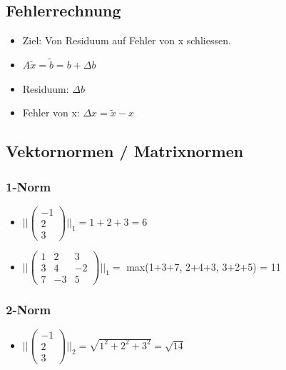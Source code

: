 \documentclass[8pt,a4paper]{scrartcl}
\begin{document}
\begin{multicols*}{3}
\begin{itemize}
				\end{itemize}
		
		\subsection{Fehlerrechnung}
			\begin{itemize}\itemsep0pt	
				\item Ziel: Von Residuum auf Fehler von x schliessen.
				\item $A \tilde{x} = \tilde{b }= b + \Delta b$
				\item Residuum: $\Delta b$
				\item Fehler von x: $\Delta x = \tilde{x}-x$
			\end{itemize}
		
		
			\subsection{Vektornormen / Matrixnormen}
				\subsubsection{1-Norm}			
					\begin{itemize}\itemsep0pt	
						\item $||\begin{pmatrix}-1\\2\\3\end{pmatrix}||_{1} = 1+2+3=6$
						\item $||\begin{pmatrix}1&2&3\\3&4&-2\\7&-3&5\end{pmatrix}||_{1} = $ max(1+3+7, 2+4+3, 3+2+5) = 11
					\end{itemize}
				\subsubsection{2-Norm}			
					\begin{itemize}\itemsep0pt	
						\item $||\begin{pmatrix}-1\\2\\3\end{pmatrix}||_{2} = \sqrt{1^{2}+2^{2}+3^{2}}=\sqrt{14}$
					\end{itemize}

\end{multicols*}
\end{document}
